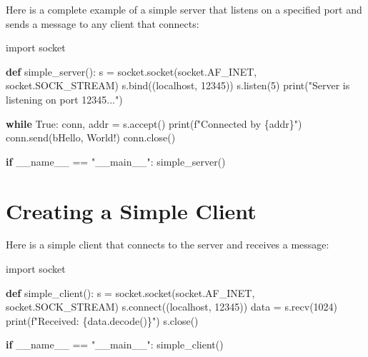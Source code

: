 \documentclass[
  letterpaper,
  DIV=11,
  numbers=noendperiod]{scrreprt}
\newenvironment{Shaded}{\begin{snugshade}}{\end{snugshade}}
\newcommand{\BuiltInTok}[1]{\textcolor[rgb]{0.00,0.23,0.31}{#1}}
\newcommand{\ControlFlowTok}[1]{\textcolor[rgb]{0.00,0.23,0.31}{\textbf{#1}}}
\newcommand{\DecValTok}[1]{\textcolor[rgb]{0.68,0.00,0.00}{#1}}
\newcommand{\ExtensionTok}[1]{\textcolor[rgb]{0.00,0.23,0.31}{#1}}
\newcommand{\ImportTok}[1]{\textcolor[rgb]{0.00,0.46,0.62}{#1}}
\newcommand{\KeywordTok}[1]{\textcolor[rgb]{0.00,0.23,0.31}{\textbf{#1}}}
\newcommand{\NormalTok}[1]{\textcolor[rgb]{0.00,0.23,0.31}{#1}}
\newcommand{\OperatorTok}[1]{\textcolor[rgb]{0.37,0.37,0.37}{#1}}
\newcommand{\SpecialCharTok}[1]{\textcolor[rgb]{0.37,0.37,0.37}{#1}}
\newcommand{\SpecialStringTok}[1]{\textcolor[rgb]{0.13,0.47,0.30}{#1}}
\newcommand{\StringTok}[1]{\textcolor[rgb]{0.13,0.47,0.30}{#1}}
\newcommand{\VariableTok}[1]{\textcolor[rgb]{0.07,0.07,0.07}{#1}}
\begin{document}
Here is a complete example of a simple server that listens on a
specified port and sends a message to any client that connects:

\begin{Shaded}
\begin{Highlighting}[]
\ImportTok{import}\NormalTok{ socket}

\KeywordTok{def}\NormalTok{ simple\_server():}
\NormalTok{    s }\OperatorTok{=}\NormalTok{ socket.socket(socket.AF\_INET, socket.SOCK\_STREAM)}
\NormalTok{    s.bind((}\StringTok{\textquotesingle{}localhost\textquotesingle{}}\NormalTok{, }\DecValTok{12345}\NormalTok{))}
\NormalTok{    s.listen(}\DecValTok{5}\NormalTok{)}
    \BuiltInTok{print}\NormalTok{(}\StringTok{"Server is listening on port 12345..."}\NormalTok{)}
    
    \ControlFlowTok{while} \VariableTok{True}\NormalTok{:}
\NormalTok{        conn, addr }\OperatorTok{=}\NormalTok{ s.accept()}
        \BuiltInTok{print}\NormalTok{(}\SpecialStringTok{f"Connected by }\SpecialCharTok{\{}\NormalTok{addr}\SpecialCharTok{\}}\SpecialStringTok{"}\NormalTok{)}
\NormalTok{        conn.send(}\StringTok{b\textquotesingle{}Hello, World!\textquotesingle{}}\NormalTok{)}
\NormalTok{        conn.close()}

\ControlFlowTok{if} \VariableTok{\_\_name\_\_} \OperatorTok{==} \StringTok{"\_\_main\_\_"}\NormalTok{:}
\NormalTok{    simple\_server()}
\end{Highlighting}
\end{Shaded}

\section{Creating a Simple Client}\label{creating-a-simple-client}

Here is a simple client that connects to the server and receives a
message:

\begin{Shaded}
\begin{Highlighting}[]
\ImportTok{import}\NormalTok{ socket}

\KeywordTok{def}\NormalTok{ simple\_client():}
\NormalTok{    s }\OperatorTok{=}\NormalTok{ socket.socket(socket.AF\_INET, socket.SOCK\_STREAM)}
\NormalTok{    s.}\ExtensionTok{connect}\NormalTok{((}\StringTok{\textquotesingle{}localhost\textquotesingle{}}\NormalTok{, }\DecValTok{12345}\NormalTok{))}
\NormalTok{    data }\OperatorTok{=}\NormalTok{ s.recv(}\DecValTok{1024}\NormalTok{)}
    \BuiltInTok{print}\NormalTok{(}\SpecialStringTok{f"Received: }\SpecialCharTok{\{}\NormalTok{data}\SpecialCharTok{.}\NormalTok{decode()}\SpecialCharTok{\}}\SpecialStringTok{"}\NormalTok{)}
\NormalTok{    s.close()}

\ControlFlowTok{if} \VariableTok{\_\_name\_\_} \OperatorTok{==} \StringTok{"\_\_main\_\_"}\NormalTok{:}
\NormalTok{    simple\_client()}
\end{Highlighting}
\end{Shaded}
\end{document}
